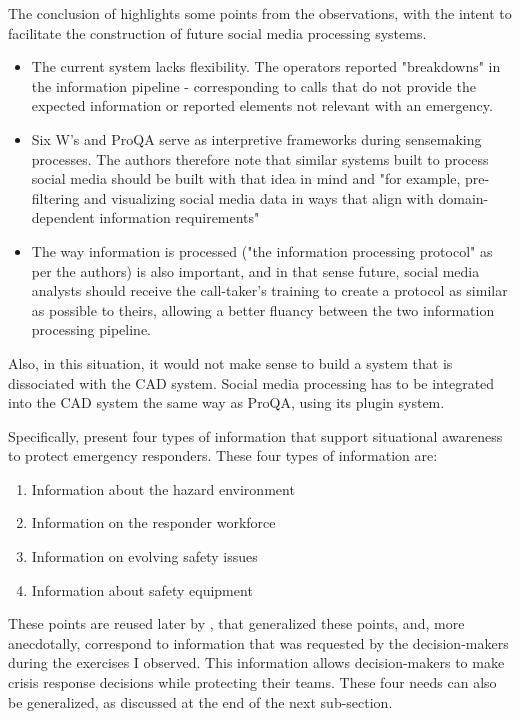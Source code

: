 The conclusion of \textcite{graceRolePlayingNext2019} highlights some points from the observations,
with the intent to facilitate the construction of future social media processing systems.
\begin{itemize}
    \item The current system lacks flexibility. The operators reported "breakdowns" in the
          information pipeline - corresponding to calls that do not provide the expected information
          or reported elements not relevant with an emergency.
    \item Six W's and ProQA serve as interpretive frameworks during sensemaking processes.
          The authors therefore note that similar systems built to process social media should
          be built with that idea in mind and "for example, pre-filtering and visualizing social
          media data in ways that align with domain-dependent information requirements"
    \item The way information is processed ("the information processing protocol" as per the authors)
          is also important, and in that sense future, social media analysts should receive the
          call-taker's training to create a protocol as similar as possible to theirs, allowing
          a better fluancy between the two information processing pipeline.
\end{itemize}
Also, in this situation, it would not make sense to build a system that is dissociated with the CAD system.
Social media processing has to be integrated into the CAD system the same way as ProQA, using its plugin system.


Specifically, \textcite{jacksonInformationSharingEmergency2006} present four types of information that support situational awareness to protect emergency responders.
These four types of information are:

\begin{enumerate}
    \item Information about the hazard environment
    \item Information on the responder workforce
    \item Information on evolving safety issues
    \item Information about safety equipment
\end{enumerate}

These points are reused later by \textcite{yangDesignPrinciplesIntegrated2012}, that generalized these points, and, more anecdotally, correspond to information that was requested by the decision-makers during the exercises I observed.
This information allows decision-makers to make crisis response decisions while protecting their teams.
These four needs can also be generalized, as discussed at the end of the next sub-section.

